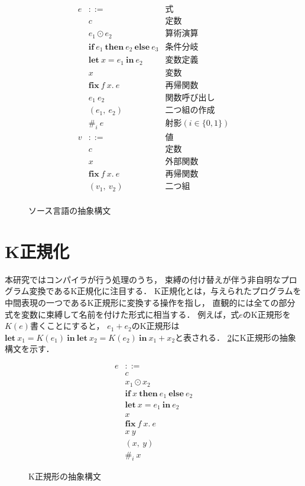 \documentclass[T]{compsoft}
\newcommand{\keyword}[1]{\mathbf{#1}}
\newcommand{\IF}{\keyword{if}}
\newcommand{\THEN}{\keyword{then}}
\newcommand{\ELSE}{\keyword{else}}
\newcommand{\LET}{\keyword{let}}
\newcommand{\FIX}{\keyword{fix}}
\newcommand{\IN}{\keyword{in}}
\begin{document}
\begin{figure}[htbp]
	\[ \begin{array}{lll}
			e & ::= & \mbox{式} \\
				& c	& \mbox{定数} \\
				& e_1 \odot e_2 & \mbox{算術演算} \\
				& \IF~e_1~\THEN~e_2~\ELSE~e_3 & \mbox{条件分岐} \\
			 	& \LET~x=e_1~\IN~e_2 & \mbox{変数定義} \\
				& x & \mbox{変数} \\
				& \FIX~f~x.~e & \mbox{再帰関数} \\
				& e_1~e_2 & \mbox{関数呼び出し} \\
				& (e_1,~e_2) & \mbox{二つ組の作成} \\
				& \#_i~e & \mbox{射影}(i \in \{0, 1\}) \\
			v & ::= & \mbox{値} \\
				& c & \mbox{定数} \\
				& x & \mbox{外部関数} \\
				& \FIX~f~x.~e & \mbox{再帰関数} \\
				& (v_1,~v_2) & \mbox{二つ組} \\
	\end{array} \]
	\caption{ソース言語の抽象構文}
	\label{eqn:mincaml-ast}
\end{figure}

\section{K正規化}
本研究ではコンパイラが行う処理のうち，
束縛の付け替えが伴う非自明なプログラム変換であるK正規化に注目する．
K正規化とは，与えられたプログラムを中間表現の一つであるK正規形\cite{Birkedal:1996:RIV:237721.237771}に変換する操作を指し，
直観的には全ての部分式を変数に束縛して名前を付けた形式に相当する．
例えば，式$e$のK正規形を$K(e)$書くことにすると，
$e_1+e_2$のK正規形は$\LET~x_1=K(e_1)~\IN~\LET~x_2=K(e_2)~\IN~x_1+x_2$と表される．
\figurename\ref{eqn:mincaml-knormal}にK正規形の抽象構文を示す．

\begin{figure}[htbp]
	\[ \begin{array}{ll}
			e & ::= \\
				& c \\
				& x_1 \odot x_2 \\
				& \IF~x~\THEN~e_1~\ELSE~e_2 \\
			 	& \LET~x=e_1~\IN~e_2 \\
				& x \\
				& \FIX~f~x.~e \\
				& x~y \\
				& (x,~y) \\
				& \#_i~x 
	\end{array} \]
	\caption{K正規形の抽象構文}
	\label{eqn:mincaml-knormal}
\end{figure}
\end{document}
